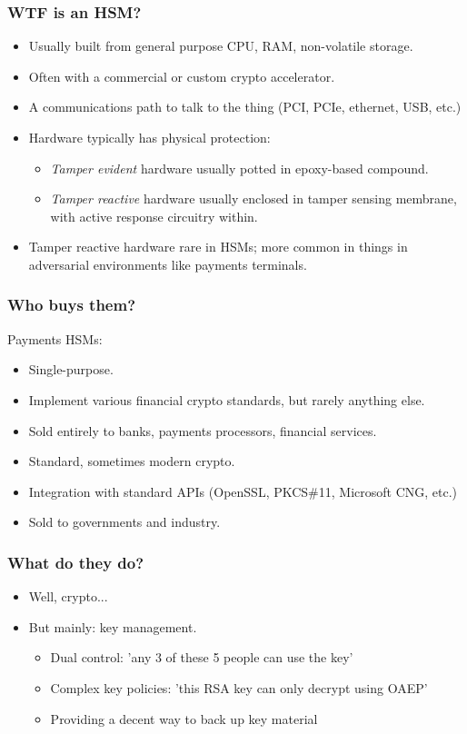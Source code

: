 \documentclass{beamer}
\begin{document}
\frame
{
  \frametitle{WTF is an HSM?}

  \begin{itemize}
  \item<1-> Usually built from general purpose CPU, RAM, non-volatile storage.
  \item<2-> Often with a commercial or custom crypto accelerator.
  \item<3-> A communications path to talk to the thing (PCI, PCIe, ethernet, USB, etc.)
  \item<4-> Hardware typically has physical protection:
    \begin{itemize}
    \item<5-> \emph{Tamper evident} hardware usually potted in epoxy-based compound.
    \item<6-> \emph{Tamper reactive} hardware usually enclosed in tamper sensing membrane, with active response circuitry within.
    \end{itemize}
  \item<7-> Tamper reactive hardware rare in HSMs; more common in things in adversarial environments like payments terminals.
  \end{itemize}
}

\frame
{
  \frametitle{Who buys them?}

  Payments HSMs:
  
  \begin{itemize}
    \item<1-> Single-purpose.
    \item<2-> Implement various financial crypto standards, but rarely anything else.
    \item<3-> Sold entirely to banks, payments processors, financial services.
  \end{itemize}


  \begin{itemize}
    \item<4-> Standard, sometimes modern crypto.
    \item<5-> Integration with standard APIs (OpenSSL, PKCS\#11, Microsoft CNG, etc.)
    \item<6-> Sold to governments and industry.
  \end{itemize}
}

\frame
{
  \frametitle{What do they do?}

  \begin{itemize}
    \item<1-> Well, crypto...
    \item<2-> But mainly: key management.  
      \begin{itemize}
        \item<3-> Dual control: 'any 3 of these 5 people can use the key'
        \item<4-> Complex key policies: 'this RSA key can only decrypt using OAEP'
        \item<5-> Providing a decent way to back up key material
      \end{itemize}
  \end{itemize}
}
\end{document}
